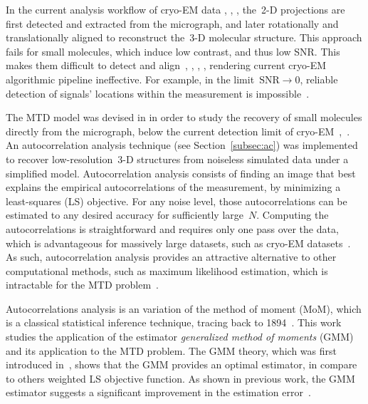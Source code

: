 \documentclass{article}
\begin{document}
In the current analysis workflow of \mbox{cryo-EM} data \cite{bendory2020single}, \cite{scheres2012relion}, \cite{punjani2017cryosparc}, the~\mbox{2-D} projections are first detected and extracted from the micrograph, and later rotationally and translationally aligned to reconstruct the~\mbox{3-D} molecular structure. This approach fails for small molecules, which induce low contrast, and thus low SNR. This makes them difficult to detect and align~\cite{bendory2018toward}, \cite{henderson1995potential}, \cite{bendory2020single}, \cite{aguerrebere2016fundamental}, rendering current \mbox{cryo-EM} algorithmic pipeline ineffective. For example, in the limit~\mbox{$\text{SNR} \rightarrow 0$}, reliable detection of signals' locations within the measurement is impossible~\cite[Proposition~3.1]{bendory2018toward}.

The MTD model was devised in \cite{bendory2018toward} in order to study the recovery of small molecules directly from the micrograph, below the current detection limit of \mbox{cryo-EM}~\cite{henderson1995potential},~\cite{d2021current}. An autocorrelation analysis technique (see Section~\ref{subsec:ac}) was implemented to recover \mbox{low-resolution}~\mbox{3-D} structures from noiseless simulated data under a simplified model. Autocorrelation analysis consists of finding an image that best explains the empirical autocorrelations of the measurement,  by minimizing a {least-squares} (LS) objective. For any noise level, those autocorrelations can be estimated to any desired accuracy for sufficiently large~$N$. Computing the autocorrelations is straightforward and requires only one pass over the data, which is advantageous for massively large datasets, such as \mbox{cryo-EM} datasets~\cite{bendory2020single}. As such, autocorrelation analysis provides an attractive alternative to other computational methods, such as maximum likelihood estimation, which is intractable for the MTD problem~\cite{lan2020multi}.


Autocorrelations analysis is an variation of the method of moment (MoM), which is a classical statistical inference technique, tracing back to 1894~\cite{pearson1894contributions}. This work studies the application of the estimator \textit{generalized method of moments} (GMM) and its application to the MTD problem. The GMM theory, which was first introduced in~\cite{Hansen1982},  shows that the GMM provides {an} optimal estimator, in compare to others weighted LS objective function. As shown in previous work, the GMM estimator suggests a significant improvement in the estimation error~\cite{Hansen1982, abas2021generalized, Fan2018,roodman2009xtabond2}.
\end{document}
